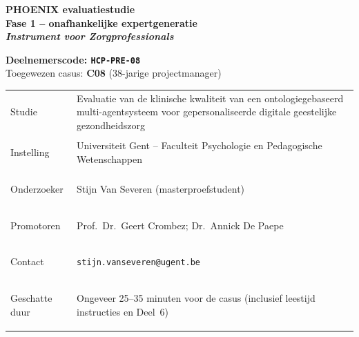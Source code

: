 \documentclass[11pt,a4paper]{article}
\renewcommand{\arraystretch}{1.28}
\begin{document}
\thispagestyle{fancy}
\vspace*{0.3cm}

\begin{tcolorbox}[
  colback=DarkBlue,colframe=DarkBlue,
  arc=3mm,left=14pt,right=14pt,top=12pt,bottom=12pt,
  width=\textwidth
]
\centering
{\fontsize{22}{28}\selectfont\bfseries\color{white}
PHOENIX evaluatiestudie\\[0.3em]
\fontsize{15}{20}\selectfont\color{AccentBlue}
Fase 1 -- onafhankelijke expertgeneratie\\[0.2em]
\fontsize{12}{16}\selectfont\color{white}
\textit{Instrument voor Zorgprofessionals}
}
\end{tcolorbox}

\vspace{0.6cm}

\begin{center}
\begin{tcolorbox}[
  colback=AccentBlue,colframe=PrimaryBlue,
  arc=2.5mm,boxrule=1.2pt,left=12pt,right=12pt,top=10pt,bottom=10pt,
  width=0.86\textwidth
]
\centering
{\large\bfseries\color{DarkBlue}Deelnemerscode: \texttt{HCP-PRE-08}}\\[0.5em]
{\normalsize\color{SlateMid}
Toegewezen casus:\quad
\textbf{\color{PrimaryBlue}C08} (38-jarige projectmanager)
}
\end{tcolorbox}
\end{center}

\vspace{0.5cm}

\begin{center}
\begin{tcolorbox}[
  colback=SoftBG,colframe=BorderGrey,
  arc=2mm,left=10pt,right=10pt,top=9pt,bottom=9pt,
  width=0.92\textwidth
]
\small\renewcommand{\arraystretch}{1.28}
\begin{tabularx}{\textwidth}{@{}>{\bfseries\raggedright\arraybackslash}p{}X@{}}
Studie & Evaluatie van de klinische kwaliteit van een ontologiegebaseerd multi-agentsysteem voor gepersonaliseerde digitale geestelijke gezondheidszorg \\
Instelling & Universiteit Gent -- Faculteit Psychologie en Pedagogische Wetenschappen \\
Onderzoeker & Stijn Van Severen (masterproefstudent) \\
Promotoren & Prof.\ Dr.\ Geert Crombez; Dr.\ Annick De Paepe \\
Contact & \texttt{stijn.vanseveren@ugent.be} \\
Geschatte duur & Ongeveer 25--35 minuten voor de casus (inclusief leestijd instructies en Deel~6) \\
\end{tabularx}
\end{tcolorbox}
\end{center}
\end{document}
